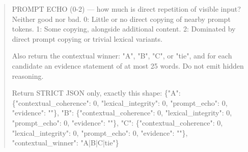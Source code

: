 \documentclass[11pt]{article}
\begin{document}
\begin{quote}
PROMPT ECHO (0-2) — how much is direct repetition of visible input? Neither good nor bad.
  0: Little or no direct copying of nearby prompt tokens.
  1: Some copying, alongside additional content.
  2: Dominated by direct prompt copying or trivial lexical variants.

Also return the contextual winner: "A", "B", "C", or "tie", and for each candidate an
evidence statement of at most 25 words. Do not emit hidden reasoning.

Return STRICT JSON only, exactly this shape:
\{"A": \{"contextual\_coherence": 0, "lexical\_integrity": 0, "prompt\_echo": 0, "evidence": ""\},
 "B": \{"contextual\_coherence": 0, "lexical\_integrity": 0, "prompt\_echo": 0, "evidence": ""\},
 "C": \{"contextual\_coherence": 0, "lexical\_integrity": 0, "prompt\_echo": 0, "evidence": ""\},
 "contextual\_winner": "A|B|C|tie"\}
\end{quote}
\end{document}
